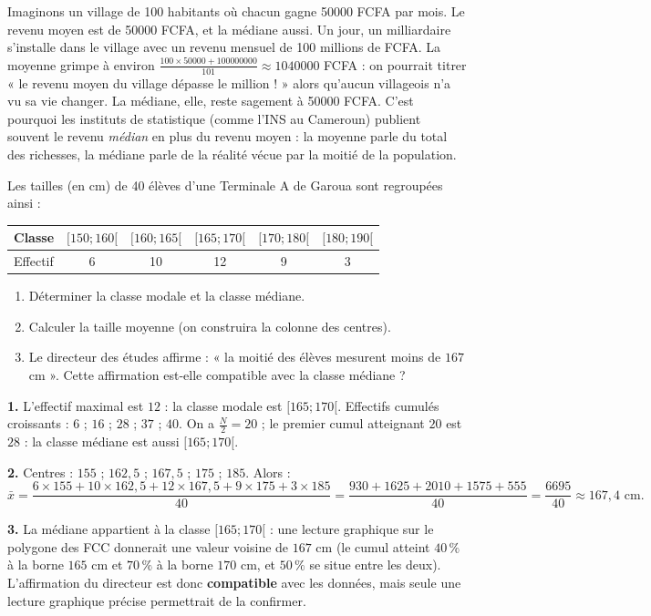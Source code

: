 \documentclass[11pt]{article}
\begin{document}
\begin{savaistu}
Imaginons un village de 100 habitants où chacun gagne \num{50000} FCFA par mois. Le revenu moyen est de \num{50000} FCFA, et la médiane aussi. Un jour, un milliardaire s'installe dans le village avec un revenu mensuel de 100 millions de FCFA. La moyenne grimpe à environ $\frac{100\times \num{50000} + \num{100000000}}{101} \approx \num{1040000}$ FCFA : on pourrait titrer « le revenu moyen du village dépasse le million ! » alors qu'aucun villageois n'a vu sa vie changer. La médiane, elle, reste sagement à \num{50000} FCFA. C'est pourquoi les instituts de statistique (comme l'INS au Cameroun) publient souvent le revenu \emph{médian} en plus du revenu moyen : la moyenne parle du total des richesses, la médiane parle de la réalité vécue par la moitié de la population.
\end{savaistu}

\begin{exercice}
Les tailles (en cm) de 40 élèves d'une Terminale A de Garoua sont regroupées ainsi :
\begin{center}
\begin{tabular}{|l|c|c|c|c|c|}
\hline
\rowcolor{popblueL} Classe & $[150;160[$ & $[160;165[$ & $[165;170[$ & $[170;180[$ & $[180;190[$ \\
\hline
Effectif & 6 & 10 & 12 & 9 & 3 \\
\hline
\end{tabular}
\end{center}
\begin{enumerate}
\item Déterminer la classe modale et la classe médiane.
\item Calculer la taille moyenne (on construira la colonne des centres).
\item Le directeur des études affirme : « la moitié des élèves mesurent moins de $167$ cm ». Cette affirmation est-elle compatible avec la classe médiane ?
\end{enumerate}
\end{exercice}

\begin{corrige}[Exercice]
\textbf{1.} L'effectif maximal est $12$ : la classe modale est $[165;170[$. Effectifs cumulés croissants : $6$ ; $16$ ; $28$ ; $37$ ; $40$. On a $\frac{N}{2} = 20$ ; le premier cumul atteignant $20$ est $28$ : la classe médiane est aussi $[165;170[$.

\textbf{2.} Centres : $155$ ; $162{,}5$ ; $167{,}5$ ; $175$ ; $185$. Alors :
\[ \bar{x} = \frac{6\times 155 + 10\times 162{,}5 + 12\times 167{,}5 + 9\times 175 + 3\times 185}{40} = \frac{930 + \num{1625} + \num{2010} + \num{1575} + 555}{40} = \frac{\num{6695}}{40} \approx 167{,}4 \text{ cm}. \]

\textbf{3.} La médiane appartient à la classe $[165;170[$ : une lecture graphique sur le polygone des FCC donnerait une valeur voisine de $167$ cm (le cumul atteint $40\,\%$ à la borne $165$ cm et $70\,\%$ à la borne $170$ cm, et $50\,\%$ se situe entre les deux). L'affirmation du directeur est donc \textbf{compatible} avec les données, mais seule une lecture graphique précise permettrait de la confirmer.
\end{corrige}
\end{document}

